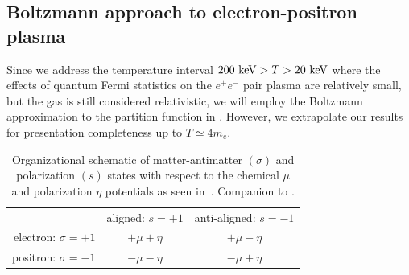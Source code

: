 \subsection{Boltzmann approach to electron-positron plasma}
\label{sec:boltzmann}
\noindent Since we address the temperature interval $200\text{ keV}>T>20\text{ keV}$ where the effects of quantum Fermi statistics on the $e^{+}e^{-}$ pair plasma are relatively small, but the gas is still considered relativistic, we will employ the Boltzmann approximation to the partition function in . However, we extrapolate our results for presentation completeness up to $T\simeq 4m_{e}$.

\begin{table}[h]
 \centering
 \begin{tabular}{ r|c|c| }
 \multicolumn{1}{r}{}
 & \multicolumn{1}{c}{aligned: $s=+1$}
 & \multicolumn{1}{c}{anti-aligned: $s=-1$} \\
 \cline{2-3}
 electron: $\sigma=+1$ & $+\mu+\eta$ & $+\mu-\eta$ \TBstrut\\
 \cline{2-3}
 positron: $\sigma=-1$ & $-\mu-\eta$ & $-\mu+\eta$ \TBstrut\\
 \cline{2-3}
 \end{tabular}\\\,\Bstrut\\
 \caption{Organizational schematic of matter-antimatter $(\sigma)$ and polarization $(s)$ states with respect to the chemical $\mu$ and polarization $\eta$ potentials as seen in~. Companion to .}
 \label{fig:org}
\end{table}

